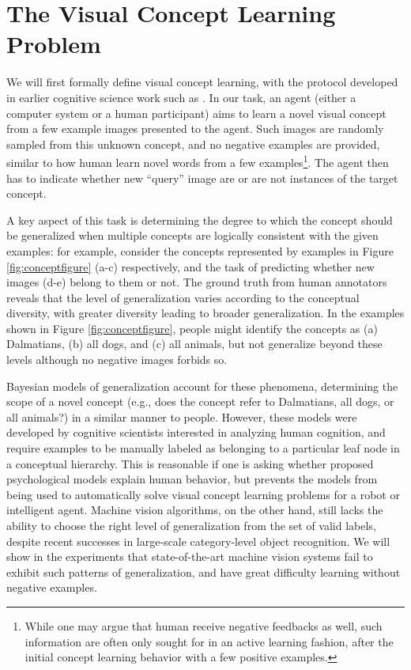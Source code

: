 
\section{The Visual Concept Learning Problem}

We will first formally define visual concept learning, with the protocol developed in earlier cognitive science work such as \cite{xu2007word}. In our task, an agent (either a computer system or a human participant) aims to learn a novel visual concept from a few example images presented to the agent. Such images are randomly sampled from this unknown concept, and no negative examples are provided, similar to how human learn novel words from a few examples\footnote{While one may argue that human receive negative feedbacks as well, such information are often only sought for in an active learning fashion, after the initial concept learning behavior with a few positive examples.}. The agent then has to indicate whether new ``query'' image are or are not instances of the target concept.

A key aspect of this task is determining the degree to which the concept should be generalized \cite{xu2007word} when multiple concepts are logically consistent with the given examples: for example, consider the concepts represented by examples in Figure \ref{fig:conceptfigure} (a-c) respectively, and the task of predicting whether new images (d-e) belong to them or not.  The ground truth from human annotators reveals that the level of generalization varies according to the conceptual diversity, with greater diversity leading to broader generalization. In the examples shown in Figure \ref{fig:conceptfigure}, people might identify the concepts as (a) Dalmatians, (b) all dogs, and (c) all animals, but not generalize beyond these levels although no negative images forbids so.

Bayesian models of generalization \cite{abbott2012, tenenbaum99, xu2007word} account for these phenomena, determining the scope of a novel concept (e.g., does the concept refer to Dalmatians, all dogs, or all animals?) in a similar manner to people. However, these models were developed by cognitive scientists interested in analyzing human cognition, and require examples to be manually labeled as belonging to a particular leaf node in a conceptual hierarchy. This is reasonable if one is asking whether proposed psychological models explain human behavior, but prevents the models from being used to automatically solve visual concept learning problems for a robot or intelligent agent. Machine vision algorithms, on the other hand, still lacks the ability to choose the right level of generalization from the set of valid labels, despite recent successes in large-scale category-level object recognition. We will show in the experiments that state-of-the-art machine vision systems fail to exhibit such patterns of generalization, and have great difficulty learning without negative examples.

